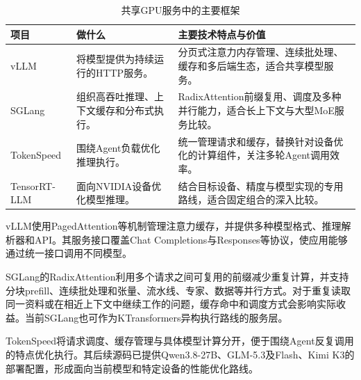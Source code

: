 \begin{table}[H]\small\centering
\caption{共享GPU服务中的主要框架}
\begin{tabularx}{\linewidth}{@{}P{29mm}Y Y@{}}\toprule
项目 & 做什么 & 主要技术特点与价值\\\midrule
vLLM & 将模型提供为持续运行的HTTP服务。 & 分页式注意力内存管理、连续批处理、缓存和多后端生态，适合共享模型服务。\\
SGLang & 组织高吞吐推理、上下文缓存和分布式执行。 & RadixAttention前缀复用、调度及多种并行能力，适合长上下文与大型MoE服务比较。\\
TokenSpeed & 围绕Agent负载优化推理执行。 & 统一管理请求和缓存，替换针对设备优化的计算组件，关注多轮Agent调用效率。\\
TensorRT-LLM & 面向NVIDIA设备优化模型推理。 & 结合目标设备、精度与模型实现的专用路线，适合固定组合的深入比较。\\\bottomrule
\end{tabularx}
\end{table}

vLLM使用PagedAttention等机制管理注意力缓存，并提供多种模型格式、推理解析器和API。其服务接口覆盖Chat Completions与Responses等协议，使应用能够通过统一接口调用不同模型。

SGLang的RadixAttention利用多个请求之间可复用的前缀减少重复计算，并支持分块prefill、连续批处理和张量、流水线、专家、数据等并行方式。对于重复读取同一资料或在相近上下文中继续工作的问题，缓存命中和调度方式会影响实际收益。当前SGLang也可作为KTransformers异构执行路线的服务层。

TokenSpeed将请求调度、缓存管理与具体模型计算分开，便于围绕Agent反复调用的特点优化执行。其后续源码已提供Qwen3.8-27B、GLM-5.3及Flash、Kimi K3的部署配置，形成面向当前模型和特定设备的性能优化路线。

